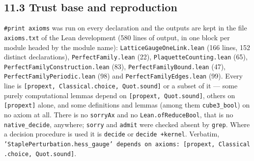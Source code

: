 \documentclass[11pt,a4paper]{article}
\theoremstyle{named}
\begin{document}
\subsection*{11.3 Trust base and reproduction}
\texttt{\#print\ \allowbreak{}axioms} was run on every declaration and the outputs are kept in the file \texttt{axioms.\allowbreak{}txt} of the Lean development (580 lines of output, in one block per module headed by the module name): \texttt{LatticeGaugeOneLink.\allowbreak{}lean} (166 lines, 152 distinct declarations), \texttt{PerfectFamily.\allowbreak{}lean} (22), \texttt{PlaquetteCounting.\allowbreak{}lean} (65), \texttt{PerfectFamilyConstruction.\allowbreak{}lean} (83), \texttt{PerfectFamilyBound.\allowbreak{}lean} (47), \texttt{PerfectFamilyPeriodic.\allowbreak{}lean} (98) and \texttt{PerfectFamilyEdges.\allowbreak{}lean} (99). Every line is \texttt{[propext,\ \allowbreak{}Classical.\allowbreak{}choice,\ \allowbreak{}Quot.\allowbreak{}sound]} or a subset of it — some purely computational lemmas depend on \texttt{[propext,\ \allowbreak{}Quot.\allowbreak{}sound]}, others on \texttt{[propext]} alone, and some definitions and lemmas (among them \texttt{cube3\_\allowbreak{}bool}) on no axiom at all. There is no \texttt{sorryAx} and no \texttt{Lean.\allowbreak{}ofReduceBool}, that is no \texttt{native\_\allowbreak{}decide}, anywhere; \texttt{sorry} and \texttt{admit} were checked absent by \texttt{grep}. Where a decision procedure is used it is \texttt{decide} or \texttt{decide\ \allowbreak{}+kernel}. Verbatim, \texttt{'StaplePerturbation.\allowbreak{}hess\_\allowbreak{}gauge'\ \allowbreak{}depends\ \allowbreak{}on\ \allowbreak{}axioms:\ \allowbreak{}[propext,\ \allowbreak{}Classical.\allowbreak{}choice,\ \allowbreak{}Quot.\allowbreak{}sound]}.
\end{document}
